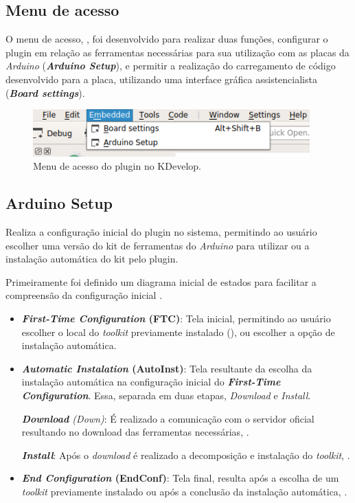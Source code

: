 \subsection{Menu de acesso}

O menu de acesso, , foi desenvolvido para realizar duas funções, configurar o plugin em relação as ferramentas necessárias para sua utilização com as placas da \textit{Arduino} (\textbf{\textit{Arduino Setup}}), e permitir a realização do carregamento de código desenvolvido para a placa, utilizando uma interface gráfica assistencialista (\textbf{\textit{Board settings}}).

\begin{figure}[!htb]
  \centering
  \caption[Menu do plugin no KDevelop]{Menu de acesso do plugin no KDevelop.}
  \label{fig:kdevelopMenu}
  \includegraphics[width=0.95\textwidth]{figuras/kdevelopMenu.png}
\end{figure}

\subsection{Arduino Setup}

Realiza a configuração inicial do plugin no sistema, permitindo ao usuário escolher uma versão do kit de ferramentas do \textit{Arduino} para utilizar ou a instalação automática do kit pelo plugin.

Primeiramente foi definido um diagrama inicial de estados para facilitar a compreensão da configuração inicial .

\begin{itemize}
\item \textbf{\textit{First-Time Configuration} (FTC)}: Tela inicial, permitindo ao usuário escolher o local do \textit{toolkit} previamente instalado (), ou escolher a opção de instalação automática. 

\item \textbf{\textit{Automatic Instalation} (AutoInst)}: Tela resultante da escolha da instalação automática na configuração inicial do \textbf{\textit{First-Time Configuration}}. Essa, separada em duas etapas, \textit{Download} e \textit{Install}.

\subitem \textit{\textbf{Download} (Down)}: É realizado a comunicação com o servidor oficial resultando no download das ferramentas necessárias, .

\subitem \textit{\textbf{Install}}: Após o \textit{download} é realizado a decomposição e instalação do \textit{toolkit}, .

\item \textbf{\textit{End Configuration} (EndConf)}: Tela final, resulta após a escolha de um \textit{toolkit} previamente instalado ou após a conclusão da instalação automática, .
\end{itemize}

